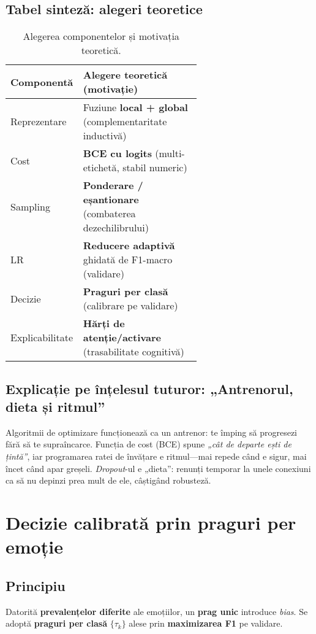 \subsection{Tabel sinteză: alegeri teoretice}
\begin{table}[h]
\centering
\begin{tabular}{l p{0.62\linewidth}}
\hline
\textbf{Componentă} & \textbf{Alegere teoretică (motivație)} \\
\hline
Reprezentare & Fuziune \textbf{local + global} (complementaritate inductivă) \\
Cost & \textbf{BCE cu logits} (multi-etichetă, stabil numeric) \\
Sampling & \textbf{Ponderare / eșantionare} (combaterea dezechilibrului) \\
LR & \textbf{Reducere adaptivă} ghidată de F1-macro (validare) \\
Decizie & \textbf{Praguri per clasă} (calibrare pe validare) \\
Explicabilitate & \textbf{Hărți de atenție/activare} (trasabilitate cognitivă) \\
\hline
\end{tabular}
\caption{Alegerea componentelor și motivația teoretică.}
\label{tab:alegeri}
\end{table}

\subsection{Explicație pe înțelesul tuturor: „Antrenorul, dieta și ritmul”}
Algoritmii de optimizare funcționează ca un antrenor: te împing să progresezi fără să te supraîncarce. Funcția de cost (BCE) spune \emph{„cât de departe ești de țintă”}, iar programarea ratei de învățare e ritmul—mai repede când e sigur, mai încet când apar greșeli. \emph{Dropout}-ul e „dieta”: renunți temporar la unele conexiuni ca să nu depinzi prea mult de ele, câștigând robusteză.

\section{Decizie calibrată prin praguri per emoție}
\label{sec:praguri}

\subsection{Principiu}
Datorită \textbf{prevalențelor diferite} ale emoțiilor, un \textbf{prag unic} introduce \emph{bias}. Se adoptă \textbf{praguri per clasă} $\{\tau_k\}$ alese prin \textbf{maximizarea F1} pe validare.


